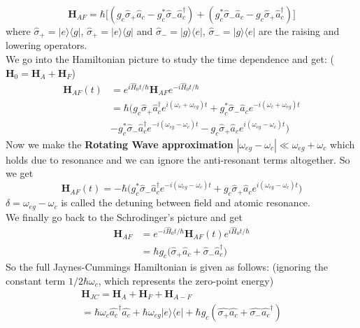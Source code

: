 \documentclass[%
 reprint,
 amsmath,amssymb,
 aps,
]{revtex4-2}
\begin{document}
\begin{equation}
    {\displaystyle {\textbf{H}}_{AF}=\hbar {\big [}(g_{c}{\hat {\sigma }}_{+}{\hat {a}}_{c}-g_{c}^{*}{\hat {\sigma }}_{-}{\hat {a}}_{c}^{\dagger })+(g_{c}^{*}{\hat {\sigma }}_{-}{\hat {a}}_{c}-g_{c}{\hat {\sigma }}_{+}{\hat {a}}_{c}^{\dagger }){\big ]}}
\end{equation}
where ${\displaystyle {\hat {\sigma }}_{+}=|e\rangle \langle g|}$, ${\displaystyle {\hat {\sigma }}_{+}=|e\rangle \langle g|}$ and ${\displaystyle {\hat {\sigma }}_{-}=|g\rangle \langle e|}$, ${\displaystyle {\hat {\sigma }}_{-}=|g\rangle \langle e|}$ are the raising and lowering operators.\\
We go into the Hamiltonian picture to study the time dependence and get:  (${\displaystyle {\textbf {H}}_{0}={\textbf {H}}_{A}+{\textbf{H}}_{F}}$)
\begin{align}
\displaystyle {\textbf{H}}_{AF}(t)&=e^{i{\hat {H}}_{0}t/\hbar }{\textbf {H}}_{AF}e^{-i{\hat {H}}_{0}t/\hbar }\nonumber\\&=\hbar {\big (}g_{c}{\hat {\sigma }}_{+}{\hat {a}}_{c}^{\dagger }e^{i(\omega _{c}+\omega _{eg})t}+g_{c}^{*}{\hat {\sigma }}_{-}{\hat {a}}_{c}e^{-i(\omega _{c}+\omega _{eg})t}\nonumber\\&-g_{c}^{*}{\hat {\sigma }}_{-}{\hat {a}}_{c}^{\dagger }e^{-i(\omega _{eg}-\omega _{c})t}-g_{c}{\hat {\sigma }}_{+}{\hat {a}}_{c}e^{i(\omega _{eg}-\omega _{c})t}{\big )}
\end{align}
Now we make the \textbf{Rotating Wave approximation} ${\displaystyle |\omega _{eg}-\omega _{c}|\ll \omega _{eg}+\omega _{c}}$ which holds due to resonance and we can ignore the anti-resonant terms altogether. So we get
\begin{equation}
    \textbf{H}_{AF}(t)=-\hbar {\big (}g_{c}^{*}{\hat {\sigma }}_{-}{\hat {a}}_{c}^{\dagger }e^{-i(\omega _{eg}-\omega _{c})t}+g_{c}{\hat {\sigma }}_{+}{\hat {a}}_{c}e^{i(\omega _{eg}-\omega _{c})t}{\big )}
\end{equation}
$\delta=\omega_{eg}-\omega_c$ is called the detuning between field and atomic resonance.\\
We finally go back to the Schrodinger's picture and get
\begin{align}
    {\textbf {H}}_{AF} &= e^{-i{\hat {H}}_{0}t/\hbar}{\textbf {H}}_{AF}(t)e^{i{\hat {H}}_{0}t/\hbar}\nonumber\\
    &= \hbar g_{c}{\big (}{\hat {\sigma}}_{+}{\hat {a}}_{c}+{\hat {\sigma }}_{-}{\hat {a}}_{c}^{\dagger }{\big )}
\end{align}
So the full Jaynes-Cummings Hamiltonian is given as follows: (ignoring the constant term $1/2\hbar\omega_c$, which represents the zero-point energy)
\begin{gather}
    \textbf{H}_{JC} =\textbf{H}_{A}+\textbf{H}_{F}+\textbf{H}_{A-F}\nonumber\\
    =\hbar\omega_c\hat{a_c}^\dagger\hat{a_c}+\hbar\omega_{eg}|{e}\rangle\langle{e}|+\hbar g_c(\hat{\sigma_+}\hat{a_c}+\hat{\sigma_-}\hat{a_c}^\dagger)
\end{gather}
\end{document}
